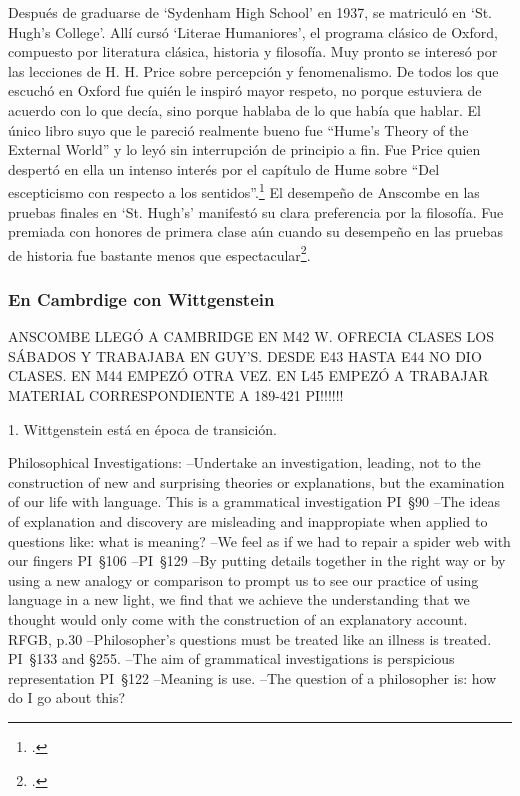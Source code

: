 Después de graduarse de `Sydenham High School' en 1937, se matriculó en `St.
Hugh's College'. Allí cursó `Literae Humaniores', el programa clásico de Oxford,
compuesto por literatura clásica, historia y filosofía. Muy pronto se interesó
por las lecciones de H. H. Price sobre percepción y fenomenalismo. De todos los
que escuchó en Oxford fue quién le inspiró mayor respeto, no porque estuviera de
acuerdo con lo que decía, sino porque hablaba de lo que había que hablar. El
único libro suyo que le pareció realmente bueno fue ``Hume's Theory of the
External World'' y lo leyó sin interrupción de principio a
fin. Fue Price quien despertó en ella un intenso interés por el capítulo de Hume
sobre ``Del escepticismo con respecto a los sentidos''.\footcite[cf.~][p.~viii
\S1]{M&PotM} El desempeño de Anscombe en las pruebas finales en `St. Hugh's'
manifestó su clara preferencia por la filosofía. Fue premiada con honores de
primera clase aún cuando su desempeño en las pruebas de historia fue bastante
menos que espectacular\footcite[p.~3~\S1]{teichmann}.

\subsubsection{En Cambrdige con Wittgenstein}
ANSCOMBE LLEGÓ A CAMBRIDGE EN M42 W. OFRECIA CLASES LOS SÁBADOS Y TRABAJABA EN
GUY'S. DESDE E43 HASTA E44 NO DIO CLASES. EN M44 EMPEZÓ OTRA VEZ. EN L45 EMPEZÓ
A TRABAJAR MATERIAL CORRESPONDIENTE A 189-421 PI!!!!!!

1. Wittgenstein está en época de transición.
\begin{revision}
Philosophical Investigations:
--Undertake an investigation, leading, not to the construction of new and
surprising theories or explanations, but the examination of our life with
language. This is a grammatical investigation PI~\S90 
--The ideas of explanation and discovery are misleading and inappropiate when
applied to questions like: what is meaning?
--We feel as if we had to repair a spider web with our fingers PI~\S106
--PI~\S129
--By putting details together in the right way or by using a new analogy or
comparison to prompt us to see our practice of using language in a new light, we
find that we achieve the understanding that we thought would only come with the
construction of an explanatory account. RFGB, p.30
--Philosopher's questions must be treated like an illness is treated. PI~\S133
and \S255.
--The aim of grammatical investigations is perspicious representation PI~\S122
--Meaning is use.
--The question of a philosopher is: how do I go about this?
\end{revision}


